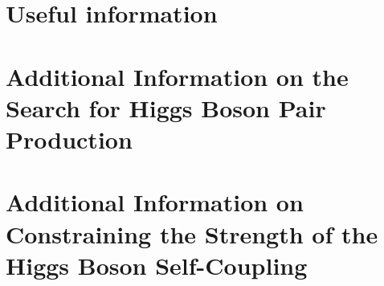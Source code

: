 \chapter{Useful information}
\label{sec:app}




\chapter{Additional Information on the Search for Higgs Boson Pair
  Production}










\chapter{Additional Information on Constraining the Strength of the
  Higgs Boson Self-Coupling}





